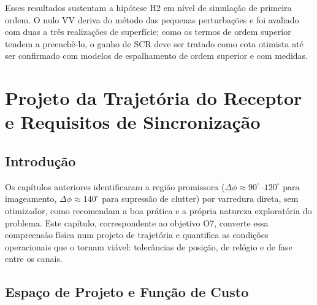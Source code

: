 \documentclass[12pt,a4paper,oneside]{book}
\theoremstyle{remark}
\theoremstyle{plain}
\theoremstyle{definition}
\begin{document}
Esses resultados sustentam a hipótese H2 em nível de simulação de primeira ordem. O
nulo VV deriva do método das pequenas perturbações e foi avaliado com duas a três
realizações de superfície; como os termos de ordem superior tendem a preenchê-lo, o
ganho de SCR deve ser tratado como cota otimista até ser confirmado com modelos de
espalhamento de ordem superior e com medidas.

\chapter{Projeto da Trajetória do Receptor e Requisitos de Sincronização}
\label{cap:trajetoria}

\section{Introdução}
\label{sec:traj_intro}

Os capítulos anteriores identificaram a região promissora
($\Delta\phi\approx90^\circ$--$120^\circ$ para imageamento,
$\Delta\phi\approx140^\circ$ para supressão de clutter) por varredura direta, sem
otimizador, como recomendam a boa prática e a própria natureza exploratória do
problema. Este capítulo, correspondente ao objetivo O7, converte essa
compreensão física num projeto de trajetória e quantifica as condições operacionais que o tornam viável:
tolerâncias de posição, de relógio e de fase entre os canais.

\section{Espaço de Projeto e Função de Custo}
\label{sec:traj_custo}
\end{document}
